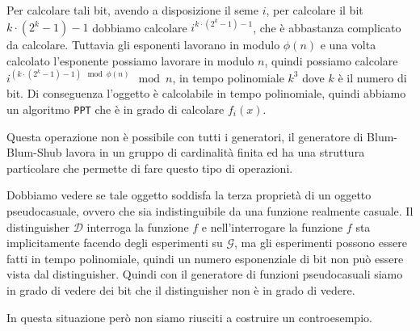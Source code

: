 \begin{figure}[H]
  \centering
\end{figure}

Per calcolare tali bit, avendo a disposizione il seme $i$, per 
calcolare il bit $k \cdot (2^k - 1) - 1$ dobbiamo calcolare
$i^{k \cdot (2^k - 1) - 1}$, che è abbastanza complicato da calcolare.
Tuttavia gli esponenti lavorano in modulo $\phi(n)$ e una volta 
calcolato l'esponente possiamo lavorare in modulo $n$, quindi
possiamo calcolare $i^{(k \cdot (2^k - 1) - 1)\mod \phi(n)} \mod n$,
in tempo polinomiale $k^3$ dove $k$ è il numero di bit.
Di conseguenza l'oggetto è calcolabile in tempo polinomiale,
quindi abbiamo un algoritmo \texttt{PPT} che è in grado di calcolare 
$f_i(x)$.

Questa operazione non è possibile con tutti i generatori, il 
generatore di Blum-Blum-Shub lavora in un gruppo di cardinalità 
finita ed ha una struttura particolare che permette di fare
questo tipo di operazioni.

Dobbiamo vedere se tale oggetto soddisfa la terza proprietà di un 
oggetto pseudocasuale, ovvero che sia indistinguibile da una funzione
realmente casuale. Il distinguisher $\mathcal{D}$ interroga 
la funzione $f$ e nell'interrogare la funzione $f$ sta implicitamente 
facendo degli esperimenti su $\mathcal{G}$, ma gli esperimenti possono essere 
fatti in tempo polinomiale, quindi un numero esponenziale di bit non 
può essere vista dal distinguisher. Quindi con il generatore di funzioni 
pseudocasuali siamo in grado di vedere dei bit che il distinguisher non è 
in grado di vedere.

In questa situazione però non siamo riusciti a costruire un controesempio.

